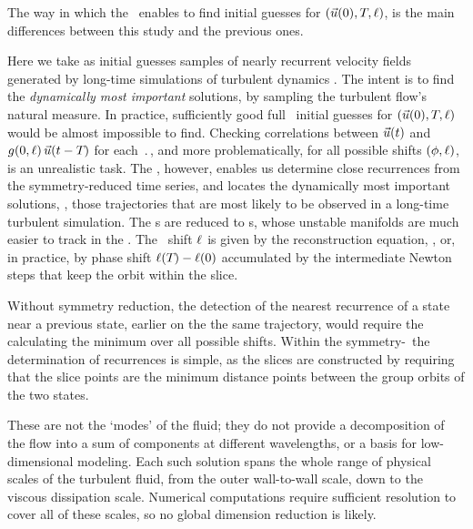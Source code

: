The way in which the \mslices\ enables to find initial
guesses for $(\vec{u}(0),{T_{}},\ell)$, is the main differences
between this study and the previous ones.

Here we take as initial guesses samples of nearly recurrent velocity
fields generated by long-time simulations of turbulent dynamics
. The intent is to find the {\em dynamically most
important} solutions, by sampling the turbulent flow's natural measure.
In practice, sufficiently good full \statesp\ initial guesses for
$(\vec{u}(0),{T_{}},\ell)$ would be almost impossible to find.
Checking correlations between $\vec{u}(t)$ and
$g(0,\ell)\,\vec{u}(t-{T_{}})$ for each $\period{}$, and
more problematically, for all possible shifts $(\phi,\ell)$, is an
unrealistic task. The \mslices, however, enables us determine close
recurrences  from the symmetry-reduced time series, and locates the
dynamically most important solutions, \ie, those trajectories that are
most likely to be observed in a long-time turbulent simulation. The \rpo
s are reduced to \po s, whose unstable manifolds are much easier to track
in the \reducedsp. The \rpo\ shift $\ell$ is given by the
reconstruction equation, , or, in practice, by phase
shift $\ell({T_{}})-\ell(0)$ accumulated by the intermediate
Newton steps that keep the orbit within the slice.

Without symmetry reduction, the detection of the nearest recurrence of a
state near a previous state, earlier on the the same trajectory, would
require the calculating the minimum over all possible shifts. Within the
symmetry-\reducedsp\ the determination of recurrences is simple, as the
slices are constructed by requiring that the slice points are the minimum
distance points between the group orbits of the two states.

These are not the `modes' of the fluid; {they
do not provide a decomposition of the flow into a sum of components at
different wavelengths, or a basis for low-dimensional
modeling.} Each such solution spans the whole range of physical scales of
the turbulent fluid, from the outer wall-to-wall scale, down to the
viscous dissipation scale. Numerical computations require sufficient
resolution to cover all of these scales, so no {global} dimension
reduction is likely.
